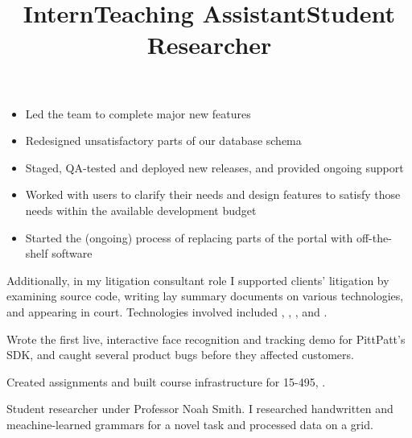 \begin{resume}
\begin{position}
\begin{itemize}
\item Led the team to complete major new features
\item Redesigned unsatisfactory parts of our database schema
\item Staged, QA-tested and deployed new releases, and provided ongoing support
\item Worked with users to clarify their needs and design features to satisfy
those needs within the available development budget
\item Started the (ongoing) process of replacing parts of the portal
with off-the-shelf software
\end{itemize}

Additionally, in my litigation consultant role I supported clients' litigation
by examining source code, writing lay summary documents on various
technologies, and appearing in court. Technologies involved included
, , ,  and
.
\end{position}

\title{Intern}
\begin{position}
Wrote the first live, interactive face recognition and tracking demo for
PittPatt's SDK, and caught several product bugs before they affected customers.
\end{position}

\title{Teaching Assistant}
\begin{position}
Created assignments and built course infrastructure for 15-495, .
\end{position}

\title{Student Researcher}
\begin{position}
Student researcher under Professor Noah Smith.
I researched handwritten and meachine-learned grammars for a novel task and processed data on a  grid.
\end{position}
 


\end{resume}
